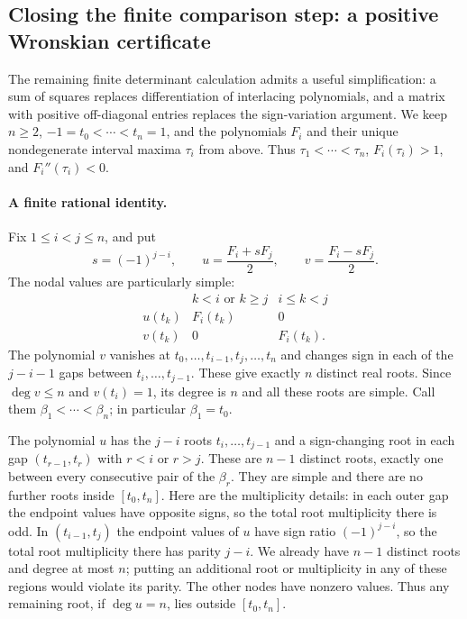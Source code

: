\documentclass[11pt]{article}
\theoremstyle{remark}
\numberwithin{equation}{section}
\begin{document}
\subsection{Closing the finite comparison step: a positive Wronskian certificate}
\label{polyretry:finite-comparison}

The remaining finite determinant calculation admits a useful
simplification: a sum of squares replaces differentiation of
interlacing polynomials, and a matrix with positive off-diagonal
entries replaces the sign-variation argument.  We keep
$n\ge2$, $-1=t_0<\cdots<t_n=1$, and the polynomials $F_i$ and
their unique nondegenerate interval maxima $\tau_i$ from above.
Thus $\tau_1<\cdots<\tau_n$,
$F_i(\tau_i)>1$, and $F_i''(\tau_i)<0$.

\paragraph{A finite rational identity.}
Fix $1\le i<j\le n$, and put
\[
 s=(-1)^{j-i},\qquad
 u=\frac{F_i+sF_j}{2},\qquad
 v=\frac{F_i-sF_j}{2}.
\]
The nodal values are particularly simple:
\[
 \begin{array}{c|cc}
 &k<i\text{ or }k\ge j&i\le k<j\\ \hline
 u(t_k)&F_i(t_k)&0\\
 v(t_k)&0&F_i(t_k).
 \end{array}
\]
The polynomial $v$ vanishes at
$t_0,\ldots,t_{i-1},t_j,\ldots,t_n$ and changes sign in each
of the $j-i-1$ gaps between $t_i,\ldots,t_{j-1}$.
These give exactly $n$ distinct real roots.  Since $\deg v\le n$
and $v(t_i)=1$, its degree is $n$ and all these roots are simple.
Call them $\beta_1<\cdots<\beta_n$; in particular $\beta_1=t_0$.

The polynomial $u$ has the $j-i$ roots
$t_i,\ldots,t_{j-1}$ and a sign-changing root in each gap
$(t_{r-1},t_r)$ with $r<i$ or $r>j$.  These are $n-1$
distinct roots, exactly one between every consecutive pair of
the $\beta_r$.  They are simple and there are no further roots
inside $[t_0,t_n]$.  Here are the multiplicity details: in each
outer gap the endpoint values have opposite signs, so the total
root multiplicity there is odd.  In $(t_{i-1},t_j)$ the endpoint
values of $u$ have sign ratio $(-1)^{j-i}$, so the total root
multiplicity there has parity $j-i$.  We already have $n-1$
distinct roots and degree at most $n$; putting an additional root
or multiplicity in any of these regions would violate its parity.
The other nodes have nonzero values.  Thus any remaining root,
if $\deg u=n$, lies outside $[t_0,t_n]$.
\end{document}
